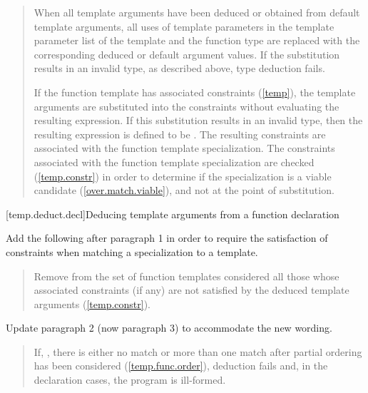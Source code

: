 \begin{quote}
\setcounter{Paras}{4}
When all template arguments have been deduced or obtained from default 
template arguments, all uses of template parameters in the template 
parameter list of the template and the function type are replaced with
the corresponding deduced or default argument values. 
% 
If the substitution results in an invalid type, as described above, type 
deduction fails.
% 
\begin{addedblock}
If the function template has associated constraints
(\ref{temp}),
the template arguments are substituted into the constraints without 
evaluating the resulting expression. If this substitution results in an 
invalid type, then the resulting expression is defined to be 
.
% 
The resulting constraints are associated with the function template
specialization.
% 
\enternote
The constraints associated with the function template specialization
are checked (\ref{temp.constr}) in order to determine 
if the specialization is a viable candidate 
(\ref{over.match.viable}), and not at the point
of substitution.
\exitnote
\end{addedblock}
\end{quote}
      

\setcounter{subsection}{5}
[temp.deduct.decl]{Deducing template arguments from a function declaration}

Add the following after paragraph 1 in order to require the
satisfaction of constraints when matching a specialization to a
template.

\begin{quote}
\begin{addedblock}
\setcounter{Paras}{2}
\pnum
Remove from the set of function templates considered all those
whose associated constraints (if any) are not satisfied by the deduced
template arguments (\ref{temp.constr}).
\end{addedblock}
\end{quote}

Update paragraph 2 (now paragraph 3) to accommodate the new wording.

\begin{quote}
\pnum
If, 
,
there is either no match or more than one match after partial ordering 
has been considered (\ref{temp.func.order}), deduction fails 
and, in the declaration cases, the program is ill-formed.
\end{quote}

